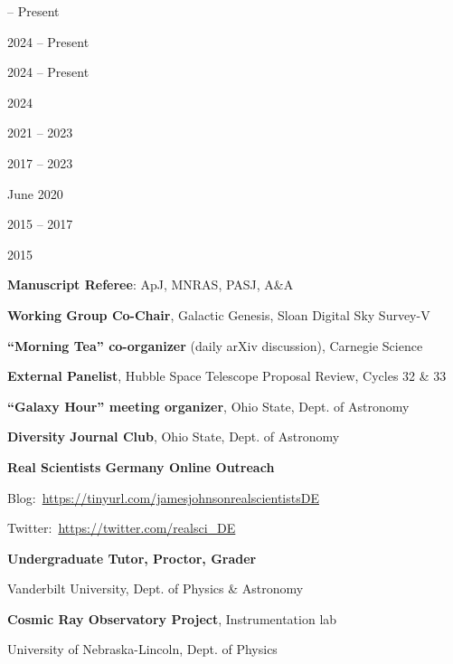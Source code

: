 \documentclass[cv.tex]{subfiles}
\begin{document}
\parbox{0.18\textwidth}{%
	 -- Present \par
	2024 -- Present \par
	2024 -- Present \par
	2024 \par
	2021 -- 2023 \par
	2017 -- 2023 \par
	June 2020 \par
	\null \par
	\null \par
	2015 -- 2017 \par
	\null \par
	2015 \par
	\null \par
}
\hspace{1mm}
\parbox{0.8\textwidth}{%
	\vspace{1mm}
	\textbf{Manuscript Referee}: ApJ, MNRAS, PASJ, A\&A \par
	\textbf{Working Group Co-Chair}, Galactic Genesis, Sloan Digital Sky Survey-V
	\par
	\textbf{``Morning Tea'' co-organizer} (daily arXiv discussion), Carnegie
	Science \par
	\textbf{External Panelist}, Hubble Space Telescope Proposal Review, Cycles 32 \& 33
	\par
	\textbf{``Galaxy Hour'' meeting organizer}, Ohio State, Dept. of Astronomy
	\par
	\textbf{Diversity Journal Club}, Ohio State, Dept. of Astronomy \par
	\textbf{Real Scientists Germany Online Outreach} \par
	Blog:~\url{https://tinyurl.com/jamesjohnsonrealscientistsDE} \par
	Twitter:~\url{https://twitter.com/realsci_DE} \par
	\textbf{Undergraduate Tutor, Proctor, Grader} \par
	Vanderbilt University, Dept. of Physics \& Astronomy \par
	\textbf{Cosmic Ray Observatory Project}, Instrumentation lab \par
	University of Nebraska-Lincoln, Dept. of Physics \par
}
\end{document}
